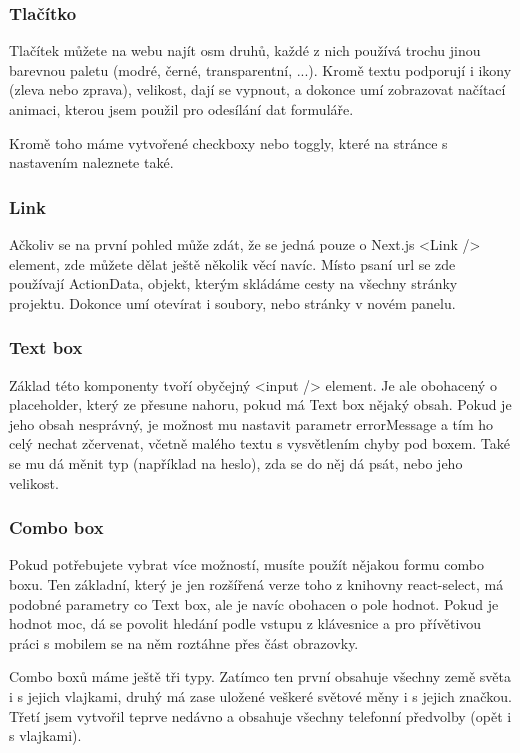 \subsubsection{Tlačítko}
Tlačítek můžete na webu najít osm druhů, každé z nich používá trochu jinou barevnou paletu (modré, černé, transparentní, ...). Kromě textu podporují i ikony (zleva nebo zprava), velikost, dají se vypnout, a dokonce umí zobrazovat načítací animaci, kterou jsem použil pro odesílání dat formuláře.

Kromě toho máme vytvořené checkboxy nebo toggly, které na stránce s nastavením naleznete také.

\subsubsection{Link}
Ačkoliv se na první pohled může zdát, že se jedná pouze o Next.js <Link /> element, zde můžete dělat ještě několik věcí navíc. Místo psaní url se zde používají ActionData, objekt, kterým skládáme cesty na všechny stránky projektu. Dokonce umí otevírat i soubory, nebo stránky v novém panelu.

\subsubsection{Text box}
Základ této komponenty tvoří obyčejný <input /> element. Je ale obohacený o placeholder, který ze přesune nahoru, pokud má Text box nějaký obsah. Pokud je jeho obsah nesprávný, je možnost mu nastavit parametr errorMessage a tím ho celý nechat zčervenat, včetně malého textu s vysvětlením chyby pod boxem. Také se mu dá měnit typ (například na heslo), zda se do něj dá psát, nebo jeho velikost.

\subsubsection{Combo box}
Pokud potřebujete vybrat více možností, musíte použít nějakou formu combo boxu. Ten základní, který je jen rozšířená verze toho z knihovny react-select, má podobné parametry co Text box, ale je navíc obohacen o pole hodnot. Pokud je hodnot moc, dá se povolit hledání podle vstupu z klávesnice a pro přívětivou práci s mobilem se na něm roztáhne přes část obrazovky.

Combo boxů máme ještě tři typy. Zatímco ten první obsahuje všechny země světa i s jejich vlajkami, druhý má zase uložené veškeré světové měny i s jejich značkou. Třetí jsem vytvořil teprve nedávno a obsahuje všechny telefonní předvolby (opět i s vlajkami).


